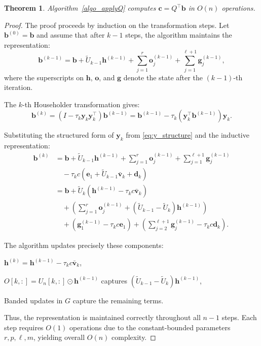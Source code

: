 \documentclass[a4paper,fleqn]{cas-sc}
\newtheorem{mytheorem}{Theorem}
\def\bfy{{\mathbf y}}
\def\bfe{{\mathbf e}}
\begin{document}
\begin{mytheorem}
Algorithm~\ref{algo_applyQ}  computes \( \mathbf{c} = Q^\top\mathbf{b} \) in \( O(n) \) operations.
\end{mytheorem}

\begin{proof}
The proof proceeds by induction on the transformation steps. Let \( \mathbf{b}^{(0)} = \mathbf{b} \) and assume that after \( k-1 \) steps, the algorithm maintains the representation:
\[
\mathbf{b}^{(k-1)} = \mathbf{b} + \tilde U_{k-1}\mathbf{h}^{(k-1)} + \sum_{j=1}^r \mathbf{o}_j^{(k-1)} + \sum_{j=1}^{\ell+1} \mathbf{g}_j^{(k-1)},
\]
where the superscripts on $\mathbf{h}$, $\mathbf{o}$, and $\mathbf{g}$ denote the state after the \( (k-1) \)-th iteration.

The \( k \)-th Householder transformation gives:
\[
\mathbf{b}^{(k)} = (I - \tau_k \bfy_k \bfy_k^\top) \mathbf{b}^{(k-1)} = \mathbf{b}^{(k-1)} - \tau_k (\bfy_k^\top \mathbf{b}^{(k-1)}) \bfy_k.
\]

Substituting the structured form of \( \bfy_k \) from \eqref{eq:y_structure} and the inductive representation:
\begin{align*}
\mathbf{b}^{(k)} &= \mathbf{b} + \tilde U_{k-1} \mathbf{h}^{(k-1)} + \sum_{j=1}^r \mathbf{o}_j^{(k-1)} + \sum_{j=1}^{\ell+1} \mathbf{g}_j^{(k-1)} \\
&\quad - \tau_k c (\bfe_1 + \tilde U_{k-1} \bar{\mathbf{v}}_k + \mathbf{d}_k) \\
&= \mathbf{b} + \tilde U_{k} (\mathbf{h}^{(k-1)} - \tau_k c \bar{\mathbf{v}}_k) \\
&\quad + \left( \sum_{j=1}^r \mathbf{o}_j^{(k-1)} + (\tilde U_{k-1} - \tilde U_k) \mathbf{h}^{(k-1)} \right) \\
&\quad + \left( \mathbf{g}_1^{(k-1)} - \tau_k c \bfe_1 \right) + \left( \sum_{j=2}^{\ell+1} \mathbf{g}_j^{(k-1)} - \tau_k c \mathbf{d}_k \right).
\end{align*}

The algorithm updates precisely these components:

\( \mathbf{h}^{(k)} = \mathbf{h}^{(k-1)} - \tau_k c \bar{\mathbf{v}}_k \),

\( O[k,:] = U_n[k,:] \odot \mathbf{h}^{(k-1)} \) captures \( (\tilde U_{k-1} - \tilde U_k) \mathbf{h}^{(k-1)} \),

Banded updates in \( G \) capture the remaining terms.


Thus, the representation is maintained correctly throughout all \( n-1 \) steps. Each step requires \( O(1) \) operations due to the constant-bounded parameters \( r, p, \ell, m \), yielding overall \( O(n) \) complexity.
\end{proof}
\end{document}
